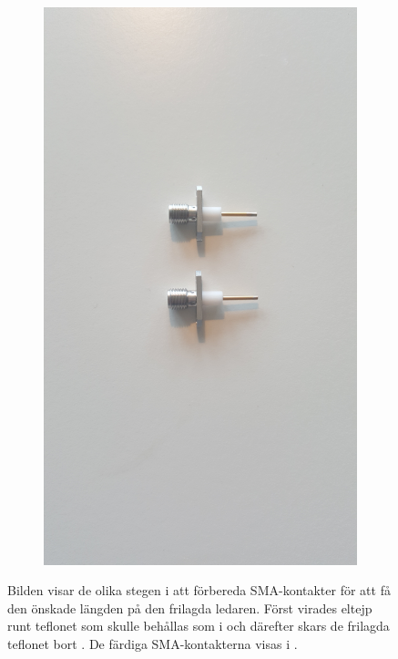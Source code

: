 \documentclass[main.tex]{subfiles}
\begin{document}
\begin{figure}[h]
\begin{subfigure}{0.25\textwidth}
        \includegraphics[angle=-90,trim=1300 100 1700 100,clip,width=0.97\linewidth]{figure/Filterbilder/e_sma_skalning.jpg} 
        \caption{}
        \label{fig:e_SMA_skalning}
    \end{subfigure}
    
    
    \caption{Bilden visar de olika stegen i att förbereda SMA-kontakter för att få den önskade längden på den frilagda ledaren. Först virades eltejp runt teflonet som skulle behållas som i  och därefter skars de frilagda teflonet bort . De färdiga SMA-kontakterna visas i .}
    \label{fig:SMA_skalning}
\end{figure}
\end{document}
